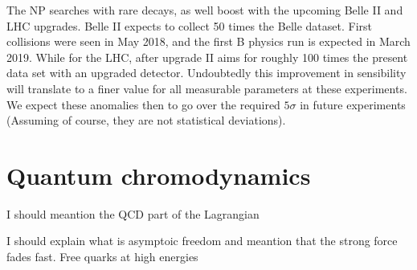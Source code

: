 The NP searches with rare decays, as well boost with the upcoming Belle II and LHC upgrades. Belle II expects to collect 50 times the Belle dataset. First collisions were seen in May 2018, and the first B physics run is expected in March 2019. While for the LHC, after upgrade II aims for roughly 100 times the present data set with an upgraded detector. 
%
%
Undoubtedly this improvement in sensibility will translate to a finer value for all measurable parameters at these experiments. We expect these anomalies then to go over the required $5 \sigma$ in future experiments (Assuming of course, they are not statistical deviations). 

{\color{green} 
\section{Quantum chromodynamics}
I should meantion the QCD part of the Lagrangian 

I should explain what is asymptoic freedom and meantion that the strong force fades fast. Free quarks at high energies}


